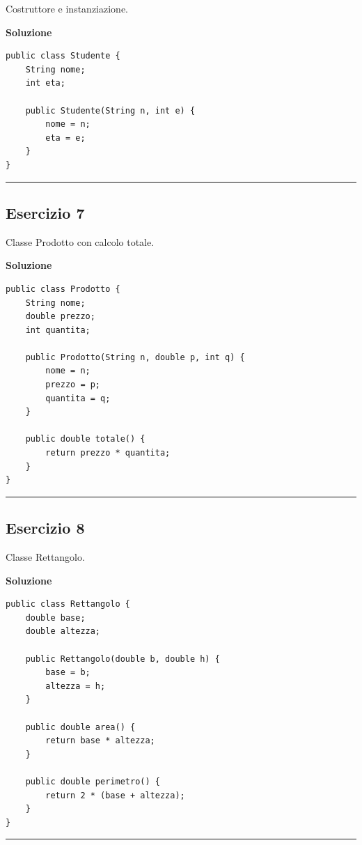 \documentclass[
]{article}
\begin{document}
Costruttore e instanziazione.

\textbf{Soluzione}

\begin{verbatim}
public class Studente {
    String nome;
    int eta;

    public Studente(String n, int e) {
        nome = n;
        eta = e;
    }
}
\end{verbatim}

\begin{center}\rule{0.5\linewidth}{0.5pt}\end{center}

\subsection{Esercizio 7}\label{esercizio-7}

Classe Prodotto con calcolo totale.

\textbf{Soluzione}

\begin{verbatim}
public class Prodotto {
    String nome;
    double prezzo;
    int quantita;

    public Prodotto(String n, double p, int q) {
        nome = n;
        prezzo = p;
        quantita = q;
    }

    public double totale() {
        return prezzo * quantita;
    }
}
\end{verbatim}

\begin{center}\rule{0.5\linewidth}{0.5pt}\end{center}

\subsection{Esercizio 8}\label{esercizio-8}

Classe Rettangolo.

\textbf{Soluzione}

\begin{verbatim}
public class Rettangolo {
    double base;
    double altezza;

    public Rettangolo(double b, double h) {
        base = b;
        altezza = h;
    }

    public double area() {
        return base * altezza;
    }

    public double perimetro() {
        return 2 * (base + altezza);
    }
}
\end{verbatim}

\begin{center}\rule{0.5\linewidth}{0.5pt}\end{center}
\end{document}
